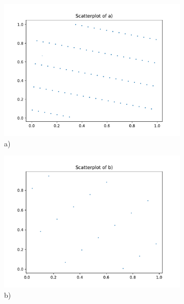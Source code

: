     \begin{figure}
        \begin{subfigure}[b]{0.5\textwidth}
          \includegraphics[width=\textwidth]{images/a2d.pdf}
          \caption{a)}
        \end{subfigure}
        \begin{subfigure}[b]{0.5\textwidth}
          \includegraphics[width=\textwidth]{images/b2d.pdf}
          \caption{b)}
        \end{subfigure}
        \begin{subfigure}[b]{0.5\textwidth}

\end{subfigure}
\end{figure}
